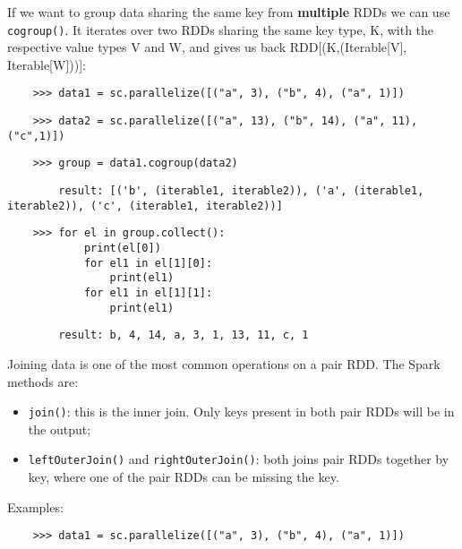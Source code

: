 If we want to group data sharing the same key from \textbf{multiple} RDDs we can use \texttt{cogroup()}. It iterates over two RDDs sharing the same key type, K, with the respective value types V and W, and gives us back RDD[(K,(Iterable[V], Iterable[W]))]:

\begin{lstlisting}
    >>> data1 = sc.parallelize([("a", 3), ("b", 4), ("a", 1)])
\end{lstlisting}

\begin{lstlisting}
    >>> data2 = sc.parallelize([("a", 13), ("b", 14), ("a", 11), ("c",1)])
\end{lstlisting}

\begin{lstlisting}
    >>> group = data1.cogroup(data2)
\end{lstlisting}

\begin{lstlisting}
        result: [('b', (iterable1, iterable2)), ('a', (iterable1, iterable2)), ('c', (iterable1, iterable2))]
\end{lstlisting}

\begin{lstlisting}
    >>> for el in group.collect():
            print(el[0])
            for el1 in el[1][0]:
                print(el1)
            for el1 in el[1][1]:
                print(el1)
\end{lstlisting}

\begin{lstlisting}
        result: b, 4, 14, a, 3, 1, 13, 11, c, 1
\end{lstlisting}


Joining data is one of the most common operations on a pair RDD. The Spark methods are:

\begin{itemize}

    \item \texttt{join()}: this is the inner join. Only keys present in both pair RDDs will be in the output;

    \item \texttt{leftOuterJoin()} and \texttt{rightOuterJoin()}: both joins pair RDDs together by key, where one of the pair RDDs can be missing the key.

\end{itemize}

Examples:
 
\begin{lstlisting}
    >>> data1 = sc.parallelize([("a", 3), ("b", 4), ("a", 1)])
\end{lstlisting}

